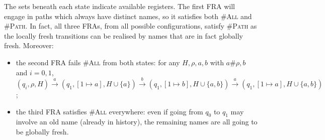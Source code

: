 \begin{example}
\begin{centering}
\end{centering}
\noindent
The sets beneath each state indicate available registers. The first FRA will engage in paths which always have distinct names, so it satisfies both \textsc{\#All} and \textsc{\#Path}. In fact, all three FRAs, from all possible configurations, satisfy \textsc{\#Path} as the locally fresh transitions can be realised by names that are in fact globally fresh. Moreover:
\begin{itemize}
\item the second FRA fails \textsc{\#All} from both states: for any $H,\rho,a,b$ with $a\#\rho, b$ and $i=0,1$, $(q_i,\rho,H)\xrightarrow{a}(q_1,[1\mapsto a],H\cup\{a\})\xrightarrow{b}(q_1,[1\mapsto b],H\cup\{a,b\})\xrightarrow{a}(q_1,[1\mapsto a],H\cup\{a,b\})$;
\item the third FRA satisfies \textsc{\#All} everywhere: even if going from $q_0$ to $q_1$ may involve an old name (already in history), the remaining names are all going to be globally fresh.
\end{itemize}
\end{example}

